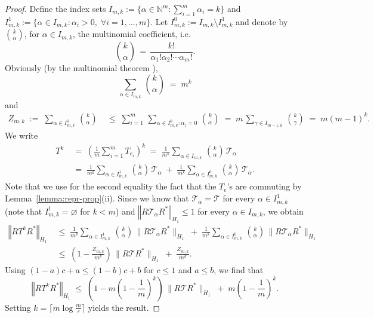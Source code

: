 \documentclass{dis}
\theoremstyle{citing}
\begin{document}
\begin{proof}
Define 
the index sets $I_{m,k}:=\{{\alpha}\in{\ensuremath{\mathbb{N}}}^m: \sum_{i=1}^m {\alpha}_i =k\}$ and 
$I^1_{m,k}:=\{{\alpha}\in I_{m,k}:  {\alpha}_i>0, \;\forall i=1,\dots,m\}$. 
Let $I^0_{m,k}:=I_{m,k}\setminus I^1_{m,k}$ and denote by 
$\binom{k}{\alpha}$, for ${\alpha}\in I_{m,k}$, the multinomial coefficient, 
i.e. 
\[
\binom{k}{\alpha} \,=\, \frac{k!}{{\alpha}_1! {\alpha}_2! \cdots {\alpha}_m!}.
\]
Obviously (by the multinomial theorem \cite[eq.~(2.21)]{HHM}), 
\[
\sum_{{\alpha}\in I_{m,k}} \,\binom{k}{\alpha} \;=\; m^k
\] 
and 
\[\begin{split}
Z_{m,k} \;:=\; \sum_{{\alpha}\in I^0_{m,k}} \,\binom{k}{\alpha}
\;&\le\; \sum_{i=1}^m\,\sum_{{\alpha}\in I^0_{m,k}: {\alpha}_i=0} \,\binom{k}{\alpha}
\;=\; m\,\sum_{{\gamma}\in I_{m-1,k}} \,\binom{k}{\gamma}
\;=\; m(m-1)^k.
\end{split}\] 
We write
\[\begin{split}
T^k \;&=\; \left(\frac1m\sum_{i=1}^m T_{e_i}\right)^k 
\;=\; \frac{1}{m^k} \sum_{{\alpha}\in I_{m,k}}\,\binom{k}{\alpha}\, {\mathcal{T}}_{\alpha} \\
&=\; \frac{1}{m^k} \sum_{{\alpha}\in I^1_{m,k}}\,\binom{k}{\alpha}\, {\mathcal{T}}_{\alpha} 
		\;+\; \frac{1}{m^k} \sum_{{\alpha}\in I^0_{m,k}}\,\binom{k}{\alpha}\, {\mathcal{T}}_{\alpha}.
\end{split}\]
Note that we use for the second equality the fact that the $T_e$'s are commuting by 
Lemma~\ref{lemma:repr-prop}(ii). 
Since we know that ${\mathcal{T}}_{\alpha}={\mathcal{T}}$ for every ${\alpha}\in I^1_{m,k}$ 
(note that $I^1_{m,k}=\varnothing$ for $k< m$) and 
${\left\Vert {R {\mathcal{T}}_{\alpha} R^*} \right\Vert}_{H_1}\le1$ for every ${\alpha}\in I_{m,k}$, we obtain
\[\begin{split}
{\left\Vert {R T^k R^*} \right\Vert}_{H_1} 
\;&\le\; \frac{1}{m^k} \sum_{{\alpha}\in I^1_{m,k}}\,\binom{k}{\alpha}\, 
						\bigl\|R {\mathcal{T}}_{\alpha} R^*\bigr\|_{H_1}
	\;+\; \frac{1}{m^k} \sum_{{\alpha}\in I^0_{m,k}}\,\binom{k}{\alpha}\, 
						\bigl\|R {\mathcal{T}}_{\alpha} R^*\bigr\|_{H_1} \\
&\le\; \left(1-\frac{Z_{m,k}}{m^k}\right) \,\bigl\|R {\mathcal{T}} R^*\bigr\|_{H_1}  
	\;+\; \frac{Z_{m,k}}{m^k}.
\end{split}\]
Using $(1-a)c+a\le(1-b)c+b$ for $c\le1$ and $a\le b$, 
we find that
\[
{\left\Vert {R T^k R^*} \right\Vert}_{H_1} \;\le\; 
	\left(1-m\left(1-\frac1m\right)^k\right)\, \bigl\|R {\mathcal{T}} R^*\bigr\|_{H_1}  
		\;+\; m\left(1-\frac1m\right)^k.
\]
Setting $k = \lceil m \log\frac{m}{\varepsilon}\rceil$ yields the result.
\end{proof}
\end{document}
